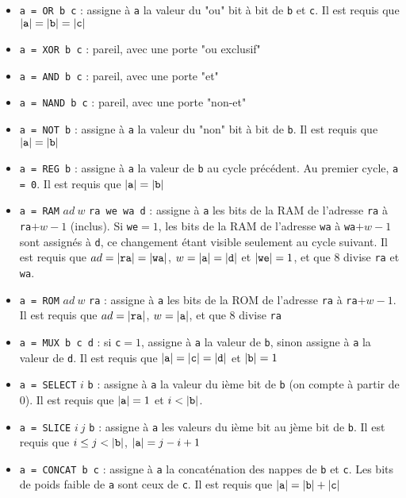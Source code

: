 \documentclass[12pt]{article}
\begin{document}
\begin{itemize}
    \item \verb$a = OR b c$ : assigne à \verb$a$ la valeur du "ou" bit à bit de \verb$b$ et \verb$c$. Il est requis que $|\verb;a;| = |\verb;b;| = |\verb;c;|$
    \item \verb$a = XOR b c$ : pareil, avec une porte "ou exclusif"
    \item \verb$a = AND b c$ : pareil, avec une porte "et"
    \item \verb$a = NAND b c$ : pareil, avec une porte "non-et"
    \item \verb$a = NOT b$ : assigne à \verb$a$ la valeur du "non" bit à bit de \verb$b$. Il est requis que $|\verb;a;| = |\verb;b;|$
    \item \verb$a = REG b$ : assigne à \verb$a$ la valeur de \verb$b$ au cycle précédent. Au premier cycle, \verb$a = 0$. Il est requis que $|\verb;a;| = |\verb;b;|$
    \item \verb$a = RAM$ $ad\ w$ \verb$ra we wa d$ : assigne à \verb$a$ les bits de la RAM de l'adresse \verb$ra$ à \verb$ra$$+w-1$ (inclus). Si \verb$we$$ = 1$, les bits de la RAM de l'adresse \verb$wa$ à \verb$wa$$+w-1$ sont assignés à \verb$d$, ce changement étant visible seulement au cycle suivant. Il est requis que $ad = |\verb;ra;| = |\verb;wa;|$, $w = |\verb;a;| = |\verb;d;|$ et $|\verb;we;| = 1$, et que $8$ divise \verb$ra$ et \verb$wa$.
    \item \verb$a = ROM$ $ad\ w$ \verb$ra$ : assigne à \verb$a$ les bits de la ROM de l'adresse \verb$ra$ à \verb$ra$$+w-1$. Il est requis que $ad = |\verb;ra;|$, $w = |\verb;a;|$, et que $8$ divise \verb$ra$
    \item \verb$a = MUX b c d$ : si \verb$c$$ = 1$, assigne à \verb$a$ la valeur de \verb$b$, sinon assigne à \verb$a$ la valeur de \verb$d$. Il est requis que $|\verb;a;| = |\verb;c;| = |\verb;d;|$ et $|\verb;b;| = 1$
    \item \verb$a = SELECT$ $i$ \verb$b$ : assigne à \verb$a$ la valeur du ième bit de \verb$b$ (on compte à partir de $0$). Il est requis que $|\verb;a;| = 1$ et $i < |\verb;b;|$.
    \item \verb$a = SLICE$ $i\ j$ \verb$b$ : assigne à \verb$a$ les valeurs du ième bit au jème bit de \verb$b$. Il est requis que $i \leq j<|\verb;b;|$, $|\verb;a;| = j-i+1$
    \item \verb$a = CONCAT b c$ : assigne à \verb$a$ la concaténation des nappes de \verb$b$ et \verb$c$. Les bits de poids faible de \verb$a$ sont ceux de \verb$c$. Il est requis que $|\verb;a;| = |\verb;b;|+|\verb;c;|$
\end{itemize}
\end{document}
